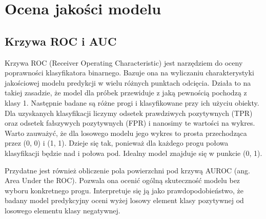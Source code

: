 \section{Ocena jakości modelu}

\subsection{Krzywa ROC i AUC}

Krzywa ROC (Receiver Operating Characteristic) jest narzędziem do oceny poprawności klasyfikatora binarnego. Bazuje ona na wyliczaniu charakterystyki jakościowej modelu predykcji w wielu różnych punktach odcięcia. Działa to na takiej zasadzie, że model dla próbek przewiduje z jaką pewnością pochodzą z klasy 1. Następnie badane są różne progi i klasyfikowane przy ich użyciu obiekty. Dla uzyskanych klasyfikacji liczymy odsetek prawdziwych pozytywnych (TPR) oraz odsetek fałszywych pozytywnych (FPR) i nanosimy te wartości na wykres. Warto zauważyć, że dla losowego modelu jego wykres to prosta przechodząca przez (0, 0) i (1, 1). Dzieje się tak, ponieważ dla każdego progu połowa klasyfikacji będzie nad i połowa pod. Idealny model znajduje się w punkcie (0, 1).

Przydatne jest również obliczenie pola powierzchni pod krzywą AUROC (ang. Area Under the ROC). Pozwala ona ocenić ogólną skuteczność modelu bez wyboru konkretnego progu. Interpretuje się ją jako prawdopodobieństwo, że badany model predykcyjny oceni wyżej losowy element klasy pozytywnej od losowego elementu klasy negatywnej.
